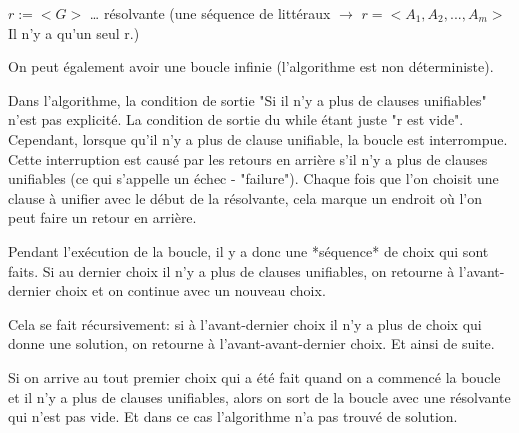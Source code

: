 \begin{algorithm}[H]
$r := <G>$ … résolvante (une séquence de littéraux $\rightarrow$ $r= <A_{1},A_{2},...,A_{m}>$  Il n’y a qu’un seul r.)\\
\end{algorithm}

On peut également avoir une boucle infinie (l’algorithme est non déterministe).

Dans l'algorithme, la condition de sortie "Si il n'y a plus de clauses unifiables" n'est pas explicité. La condition de sortie du while étant juste "r est vide". 
Cependant, lorsque qu'il n'y a plus de clause unifiable, la boucle est interrompue.  Cette interruption est causé par les retours en arrière s'il n'y a plus de clauses unifiables (ce qui s'appelle un échec - "failure"). 
Chaque fois que l'on choisit une clause à unifier avec le début de la résolvante, cela marque un endroit où l'on peut faire un retour en arrière. 

Pendant l'exécution de la boucle, il y a donc une *séquence* de choix qui sont faits. Si au dernier choix il n'y a plus de clauses unifiables, on retourne à l'avant-dernier choix et on continue avec un nouveau choix. 

Cela se fait récursivement: si à l'avant-dernier choix il n'y a plus de choix qui donne une solution, on retourne à l'avant-avant-dernier choix. Et ainsi de suite. 

Si on arrive au tout premier choix qui a été fait quand on a commencé la boucle et il n'y a plus de clauses unifiables, alors on sort de la boucle avec une résolvante qui n'est pas vide. Et dans ce cas l'algorithme n'a pas trouvé de solution. 

